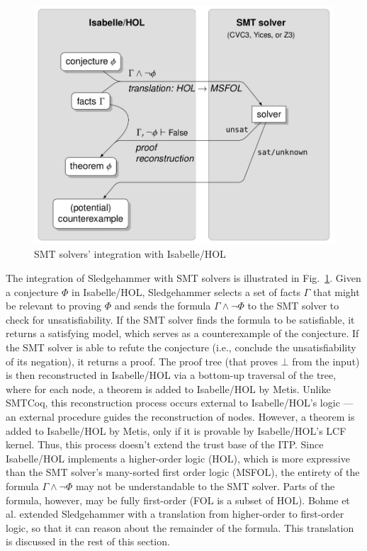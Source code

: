 \documentclass{article}
\begin{document}
	\begin{figure}[t]
		\begin{center}
			\includegraphics[scale=0.3]{sledgehammer}
			\caption{SMT solvers' integration with 
			Isabelle/HOL}
			\label{fig:sledgehammer}
		\end{center}
	\end{figure}

	The integration of Sledgehammer 
	with SMT solvers is illustrated in 
	Fig.~\ref{fig:sledgehammer}. Given 
	a conjecture $\Phi$ in 
	Isabelle/HOL, Sledgehammer 
	selects a set of facts 
	$\Gamma$ that might be relevant 
	to proving $\Phi$ and sends
	the formula $\Gamma \land \neg 
	\Phi$ to the SMT solver to check 
	for unsatisfiability. If the SMT 
	solver finds the formula to be 
	satisfiable, it returns a satisfying 
	model, which serves as a 
	counterexample 
	of the conjecture. If the SMT 
	solver is able to refute the 
	conjecture (i.e., conclude 
	the unsatisfiability of its 
	negation), it returns 
	a proof. The proof tree (that
	proves $\bot$ from the 
	input) is then reconstructed in 
	Isabelle/HOL via a bottom-up 
	traversal of the tree, where 
	for each node, a theorem is 
	added to Isabelle/HOL by Metis.
	Unlike SMTCoq, this reconstruction
	process occurs external to 
	Isabelle/HOL's logic ---
	an external procedure guides 
	the reconstruction of nodes. 
	However, a theorem is added to 
	Isabelle/HOL by Metis, only if it 
	is provable by Isabelle/HOL's LCF 
	kernel. Thus, this process doesn't
	extend the trust base of the ITP.
	Since Isabelle/HOL 
	implements a higher-order logic 
	(HOL), which 
	is more expressive than 
	the SMT solver's many-sorted
	first order logic (MSFOL),
	the entirety of the formula
	$\Gamma \land \neg \Phi$ may not 
	be understandable to the SMT 
	solver. Parts of the formula,
	however, may be fully 
	first-order (FOL is 
	a subset of HOL). Bohme et al.
	extended Sledgehammer with 
	a translation from higher-order 
	to first-order logic, so that 
	it can reason about the remainder
	of the formula. This translation
	is discussed in the rest of this 
	section.
	
\end{document}
